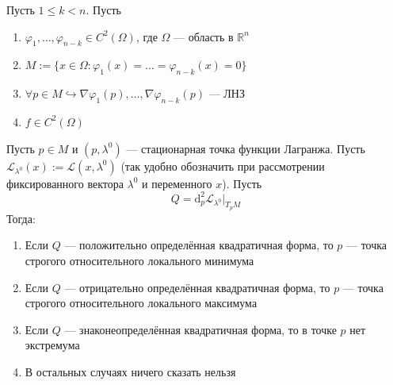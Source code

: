 \documentclass[11pt]{article}
\begin{document}
\begin{theorem}
    Пусть $1 \leq k < n$. Пусть
    \begin{enumerate}
        \item $\varphi_1, \ldots, \varphi_{n - k} \in C^{2} (\Omega)$, где $\Omega$ --- область в $\mathbb{R}^n$
        \item $M := \{x \in \Omega : \varphi_1 (x) = \ldots = \varphi_{n - k} (x) = 0\}$
        \item $\forall p \in M \hookrightarrow \nabla \varphi_1 (p), \ldots, \nabla \varphi_{n - k} (p)$ --- ЛНЗ
        \item $f \in C^{2} (\Omega)$
    \end{enumerate}
    Пусть $p \in M$ и $(p, \lambda^0)$ --- стационарная точка функции Лагранжа. Пусть $\mathcal{L}_{\lambda^0} (x) := \mathcal{L} (x, \lambda^0)$ (так удобно обозначить при рассмотрении фиксированного вектора $\lambda^0$ и переменного $x$). Пусть 
    \[Q = \mathrm{d}^2_p \mathcal{L}_{\lambda^0} \Big|_{T_p M}\]
    Тогда:
    \begin{enumerate}
        \item Если $Q$ --- положительно определённая квадратичная форма, то $p$ --- точка строгого относительного локального минимума
        \item Если $Q$ --- отрицательно определённая квадратичная форма, то $p$ --- точка строгого относительного локального максимума
        \item Если $Q$ --- знаконеопределённая квадратичная форма, то в точке $p$ нет экстремума
        \item В остальных случаях ничего сказать нельзя
    \end{enumerate}
\end{theorem}
\end{document}
